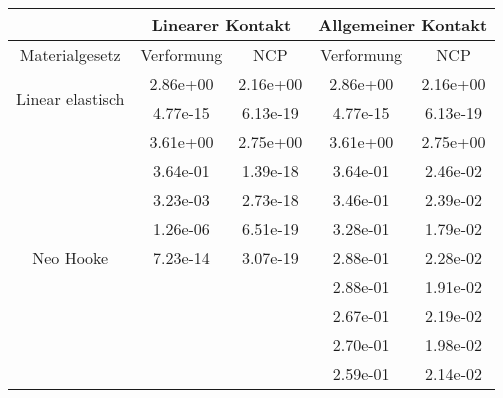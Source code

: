 \begin{table} 
\centering 
\begin{tabular}{c|cc|cc|} 
\cline{2-5} 
 & \multicolumn{2}{|c|}{Linearer Kontakt} & \multicolumn{2}{|c|}{Allgemeiner Kontakt} \\ 
\hline 
\multicolumn{1}{|c|}{Materialgesetz} & \multicolumn{1}{c|}{Verformung} & \multicolumn{1}{c|}{NCP} & \multicolumn{1}{c|}{Verformung} & \multicolumn{1}{c|}{NCP} \\ 
\hline 
\multicolumn{1}{|c|}{\multirow{2}{*}{Linear elastisch}} &\multicolumn{1}{|c|}{  2.86e+00} & \multicolumn{1}{|c|}{  2.16e+00} & \multicolumn{1}{|c|}{  2.86e+00} & \multicolumn{1}{|c|}{  2.16e+00} \\ 
\multicolumn{1}{|c|}{} & \multicolumn{1}{|c|}{  4.77e-15} & \multicolumn{1}{|c|}{  6.13e-19} & \multicolumn{1}{|c|}{  4.77e-15} & \multicolumn{1}{|c|}{  6.13e-19} \\ 
\hline 
\multicolumn{1}{|c|}{\multirow{101}{*}{Neo Hooke}} &\multicolumn{1}{|c|}{  3.61e+00} & \multicolumn{1}{|c|}{  2.75e+00} & \multicolumn{1}{|c|}{  3.61e+00} & \multicolumn{1}{|c|}{  2.75e+00} \\ 
\multicolumn{1}{|c|}{} & \multicolumn{1}{|c|}{  3.64e-01} & \multicolumn{1}{|c|}{  1.39e-18} & \multicolumn{1}{|c|}{  3.64e-01} & \multicolumn{1}{|c|}{  2.46e-02} \\ 
\multicolumn{1}{|c|}{} & \multicolumn{1}{|c|}{  3.23e-03} & \multicolumn{1}{|c|}{  2.73e-18} & \multicolumn{1}{|c|}{  3.46e-01} & \multicolumn{1}{|c|}{  2.39e-02} \\ 
\multicolumn{1}{|c|}{} & \multicolumn{1}{|c|}{  1.26e-06} & \multicolumn{1}{|c|}{  6.51e-19} & \multicolumn{1}{|c|}{  3.28e-01} & \multicolumn{1}{|c|}{  1.79e-02} \\ 
\multicolumn{1}{|c|}{} & \multicolumn{1}{|c|}{  7.23e-14} & \multicolumn{1}{|c|}{  3.07e-19} & \multicolumn{1}{|c|}{  2.88e-01} & \multicolumn{1}{|c|}{  2.28e-02} \\ 
\multicolumn{1}{|c|}{} & \multicolumn{1}{|c|}{} & \multicolumn{1}{|c|}{} & \multicolumn{1}{|c|}{  2.88e-01} & \multicolumn{1}{|c|}{  1.91e-02} \\ 
\multicolumn{1}{|c|}{} & \multicolumn{1}{|c|}{} & \multicolumn{1}{|c|}{} & \multicolumn{1}{|c|}{  2.67e-01} & \multicolumn{1}{|c|}{  2.19e-02} \\ 
\multicolumn{1}{|c|}{} & \multicolumn{1}{|c|}{} & \multicolumn{1}{|c|}{} & \multicolumn{1}{|c|}{  2.70e-01} & \multicolumn{1}{|c|}{  1.98e-02} \\ 
\multicolumn{1}{|c|}{} & \multicolumn{1}{|c|}{} & \multicolumn{1}{|c|}{} & \multicolumn{1}{|c|}{  2.59e-01} & \multicolumn{1}{|c|}{  2.14e-02} \\ 

\end{tabular}
\end{table}
